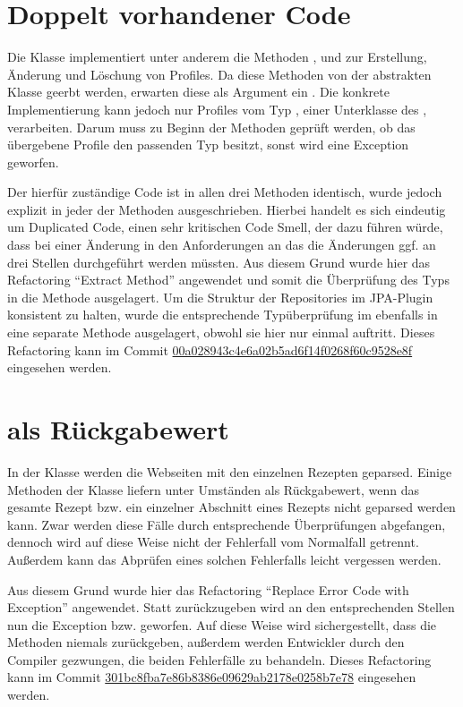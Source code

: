 \section{Doppelt vorhandener Code}
Die Klasse  implementiert unter anderem die Methoden ,  und  zur Erstellung, Änderung und Löschung von Profiles. Da diese Methoden von der abstrakten Klasse  geerbt werden, erwarten diese als Argument ein . Die konkrete Implementierung  kann jedoch nur Profiles vom Typ , einer Unterklasse des , verarbeiten. Darum muss zu Beginn der Methoden geprüft werden, ob das übergebene Profile den passenden Typ besitzt, sonst wird eine Exception geworfen.

Der hierfür zuständige Code ist in allen drei Methoden identisch, wurde jedoch explizit in jeder der Methoden ausgeschrieben. Hierbei handelt es sich eindeutig um Duplicated Code, einen sehr kritischen Code Smell, der dazu führen würde, dass bei einer Änderung in den Anforderungen an das  die Änderungen ggf. an drei Stellen durchgeführt werden müssten. Aus diesem Grund wurde hier das Refactoring \enquote{Extract Method} angewendet und somit die Überprüfung des Typs in die Methode  ausgelagert. Um die Struktur der Repositories im JPA-Plugin konsistent zu halten, wurde die entsprechende Typüberprüfung im  ebenfalls in eine separate Methode ausgelagert, obwohl sie hier nur einmal auftritt. Dieses Refactoring kann im Commit \href{https://github.com/anditru/quickie/commit/00a028943c4e6a02b5ad6f14f0268f60c9528e8f}{00a028943c4e6a02b5ad6f14f0268f60c9528e8f} eingesehen werden.

\section{ als Rückgabewert}
In der Klasse  werden die Webseiten mit den einzelnen Rezepten geparsed. Einige Methoden der Klasse liefern unter Umständen  als Rückgabewert, wenn das gesamte Rezept bzw. ein einzelner Abschnitt eines Rezepts nicht geparsed werden kann. Zwar werden diese Fälle durch entsprechende Überprüfungen abgefangen, dennoch wird auf diese Weise nicht der Fehlerfall vom Normalfall getrennt. Außerdem kann das Abprüfen eines solchen Fehlerfalls leicht vergessen werden.

Aus diesem Grund wurde hier das Refactoring \enquote{Replace Error Code with Exception} angewendet. Statt  zurückzugeben wird an den entsprechenden Stellen nun die Exception  bzw.  geworfen. Auf diese Weise wird sichergestellt, dass die Methoden niemals  zurückgeben, außerdem werden Entwickler durch den Compiler gezwungen, die beiden Fehlerfälle zu behandeln. Dieses Refactoring kann im Commit \href{https://github.com/anditru/quickie/commit/301bc8fba7e86b8386e09629ab2178e0258b7e78}{301bc8fba7e86b8386e09629ab2178e0258b7e78} eingesehen werden.
